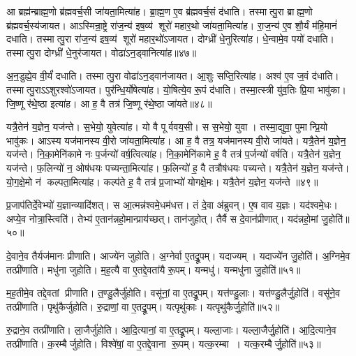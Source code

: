 आ ब्रह्म॑न्ब्राह्म॒णो ब्र॑ह्मवर्च॒सी जा॑यता॒मित्या॑ह।
ब्रा॒ह्म॒ण ए॒व ब्र॑ह्मवर्च॒सं द॑धाति।
तस्मात्पु॒रा ब्राह्म॒णो ब्र॑ह्मवर्च॒स्य॑जायत।
आऽस्मिन्रा॒ष्ट्रे रा॑ज॒न्य॑ इष॒व्य॑ शूरो॑ महार॒थो जा॑यता॒मित्या॑ह।
रा॒ज॒न्य॑ ए॒व शौ॒र्यं म॑हि॒मानं॑ दधाति।
तस्मात्पु॒रा रा॑ज॒न्य॑ इष॒व्य॑ शूरो॑ महार॒थो॑ऽजायत।
दोग्ध्री॑ धे॒नुरित्या॑ह।
धे॒न्वामे॒व पयो॑ दधाति।
तस्मात्पु॒रा दोग्ध्री॑ धे॒नुर॑जायत।
वोढा॑ऽन॒ड्वानित्या॑ह॥४७॥

अ॒न॒डुह्ये॒व वी॒र्यं॑ दधाति।
तस्मात्पु॒रा वोढा॑ऽन॒ड्वान॑जायत।
आ॒शुः सप्ति॒रित्या॑ह।
अश्व॑ ए॒व ज॒वं द॑धाति।
तस्मात्पु॒राऽऽशुरश्वो॑ऽजायत।
पुर॑न्धि॒र्योषेत्या॑ह।
यो॒षित्ये॒व रू॒पं द॑धाति।
तस्मा॒त्स्त्री यु॑व॒तिः प्रि॒या भावु॑का।
जि॒ष्णू र॑थे॒ष्ठा इत्या॑ह।
आ ह॒ वै तत्र॑ जि॒ष्णू र॑थे॒ष्ठा जा॑यते॥४८॥

यत्रै॒तेन॑ य॒ज्ञेन॒ यज॑न्ते।
स॒भेयो॒ युवेत्या॑ह।
यो वै पूर्ववय॒सी।
स स॒भेयो॒ युवा।
तस्मा॒द्युवा॒ पुमान्प्रि॒यो भावु॑कः।
आऽस्य यज॑मानस्य वी॒रो जा॑यता॒मित्या॑ह।
आ ह॒ वै तत्र॒ यज॑मानस्य वी॒रो जा॑यते।
यत्रै॒तेन॑ य॒ज्ञेन॒ यज॑न्ते।
नि॒का॒मेनि॑कामे नः प॒र्जन्यो॑ वर्\mbox{}ष॒त्वित्या॑ह।
नि॒का॒मेनि॑कामे ह॒ वै तत्र॑ प॒र्जन्यो॑ वर्\mbox{}षति।
यत्रै॒तेन॑ य॒ज्ञेन॒ यज॑न्ते।
फ॒लिन्यो॑ न॒ ओष॑धयः पच्यन्ता॒मित्या॑ह।
फ॒लिन्यो॑ ह॒ वै तत्रौष॑धयः पच्यन्ते।
यत्रै॒तेन॑ य॒ज्ञेन॒ यज॑न्ते।
यो॒ग॒क्षे॒मो न॑ कल्पता॒मित्या॑ह।
कल्प॑ते ह॒ वै तत्र॑ प्र॒जाभ्यो॑ योगक्षे॒मः।
यत्रै॒तेन॑ य॒ज्ञेन॒ यज॑न्ते ॥४९॥\anuvakamend[अ॒न॒ड्वानित्या॑ह जायते वर्‌षति स॒प्त च॑]

प्र॒जाप॑तिर्दे॒वेभ्यो॑ य॒ज्ञान्व्यादि॑शत्।
स आ॒त्मन्न॑श्वमे॒धम॑धत्त।
तं दे॒वा अ॑ब्रुवन्।
ए॒ष वाव य॒ज्ञः।
यद॑श्वमे॒धः।
अप्ये॒व नोत्रा॒स्त्विति॑।
तेभ्य॑ ए॒तान॑न्नहो॒मान्प्राय॑च्छत्।
तान॑जुहोत्।
तैर्वै स दे॒वान॑प्रीणात्।
यद॑न्नहो॒मां जु॒होति॑॥५०॥

दे॒वाने॒व तैर्यज॑मानः प्रीणाति।
आज्ये॑न जुहोति।
अ॒ग्नेर्वा ए॒तद्रू॒पम्।
यदाज्यम्।
यदाज्ये॑न जु॒होति॑।
अ॒ग्निमे॒व तत्प्री॑णाति।
मधु॑ना जुहोति।
म॒ह॒त्यै वा ए॒तद्दे॒वता॑यै रू॒पम्।
यन्मधु॑।
यन्मधु॑ना जु॒होति॑॥५१॥

म॒ह॒तीमे॒व तद्दे॒वतां प्रीणाति।
त॒ण्डु॒लैर्जु॑होति।
वसू॑नां॒ वा ए॒तद्रू॒पम्।
यत्त॑ण्डु॒लाः।
यत्त॑ण्डु॒लैर्जु॒होति॑।
वसू॑ने॒व तत्प्री॑णाति।
पृथु॑कैर्जुहोति।
रु॒द्राणां॒ वा ए॒तद्रू॒पम्।
यत्पृथु॑काः।
यत्पृथु॑कैर्जु॒होति॑॥५२॥

रु॒द्राने॒व तत्प्री॑णाति।
ला॒जैर्जु॑होति।
आ॒दि॒त्यानां॒ वा ए॒तद्रू॒पम्।
यल्ला॒जाः।
यल्ला॒जैर्जु॒होति॑।
आ॒दि॒त्याने॒व तत्प्री॑णाति।
क॒रम्बैर्जुहोति।
विश्वे॑षां॒ वा ए॒तद्दे॒वाना रू॒पम्।
यत्क॒रम्बा।
यत्क॒रम्बैर्जु॒होति॑॥५३॥


